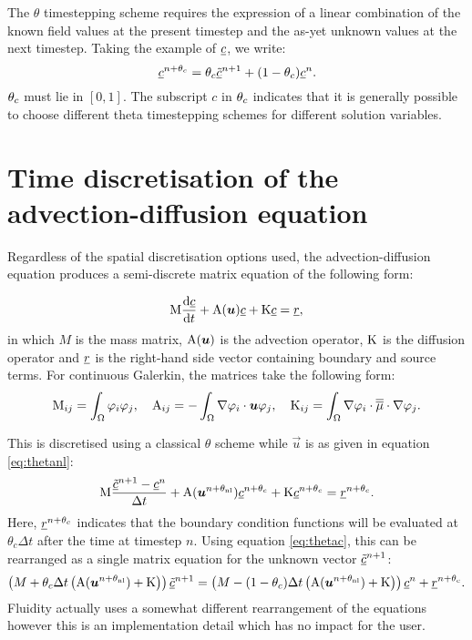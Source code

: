 The $\theta$ timestepping scheme requires the expression of a linear
combination of the known field values at the present timestep and the as-yet
unknown values at the next timestep. Taking the example of $\underline{c}$, we write:
\begin{equation}
  \label{eq:thetac}
  \underline{c}^{n+\theta_c}=\theta_c\underline{\tilde c}^{n+1}+(1-\theta_c)\underline{c}^{n}.
\end{equation}
$\theta_c$ must lie in $[0,1]$. The subscript $c$ in $\theta_c$ indicates that it is 
generally possible to choose different theta timestepping schemes for different solution
variables.

\section{Time discretisation of the advection-diffusion equation}
\label{sect:ND_time_disct_adv_diff}

Regardless of the spatial discretisation options used, the
advection-diffusion equation produces a semi-discrete matrix equation of the
following form:

\begin{equation}
  \mathrm{M} \frac{\mathrm{d}\underline{c}}{\mathrm{d} t}+\mathrm{A}({\mbox{\boldmath$u$}})\underline{c}+\mathrm{K}\underline{c}=\underline{r},
\end{equation}
in which $M$ is the mass matrix, $\mathrm{A}({\mbox{\boldmath$u$}})$ is the advection
operator, $\mathrm{K}$ is the diffusion operator and $\underline{r}$ is the
right-hand side vector containing boundary and source terms. For continuous
Galerkin, the matrices take the following form:
\begin{equation}
  \mathrm{M}_{ij}=\int_\Omega \varphi_i\varphi_j, \quad
  \mathrm{A}_{ij}=-\int_\Omega \nabla\varphi_i\cdot{\mbox{\boldmath$u$}} \varphi_j, \quad
  \mathrm{K}_{ij}=\int_\Omega \nabla\varphi_i\cdot \overline{\overline{\mu}}\cdot\nabla \varphi_j.
\end{equation}

This is discretised using a classical $\theta$ scheme while $\vec u$ is as
given in equation \eqref{eq:thetanl}:
\begin{equation}
  \mathrm{M} \frac{\underline{\tilde c}^{n+1}-\underline{c}^{n}}{\Delta t}
  +\mathrm{A}({\mbox{\boldmath$u$}}^{n+\theta_{\mathrm{nl}}})\underline{c}^{n+\theta_c}+\mathrm{K}\underline{c}^{n+\theta_c}=\underline{r}^{n+\theta_c}.
\end{equation}
Here, $\underline{r}^{n+\theta_c}$ indicates that the boundary condition
functions will be evaluated at $\theta_c\Delta t$ after the time at timestep
$n$. Using equation \eqref{eq:thetac}, this can be rearranged as a single
matrix equation for the unknown vector $\underline{\tilde c}^{n+1}$:
\begin{equation}
  \left(M+\theta_c\Delta t\left(\mathrm{A}({\mbox{\boldmath$u$}}^{n+\theta_{\mathrm{nl}}})+\mathrm{K}\right)\right)\underline{\tilde c}^{n+1}
  =\left(M-(1-\theta_c)\Delta
    t\left(\mathrm{A}({\mbox{\boldmath$u$}}^{n+\theta_{\mathrm{nl}}})+\mathrm{K}\right)\right)\underline{c}^{n} +\underline{r}^{n+\theta_c}.
\end{equation}
Fluidity actually uses a somewhat different rearrangement of the equations
however this is an implementation detail which has no impact for the user.

